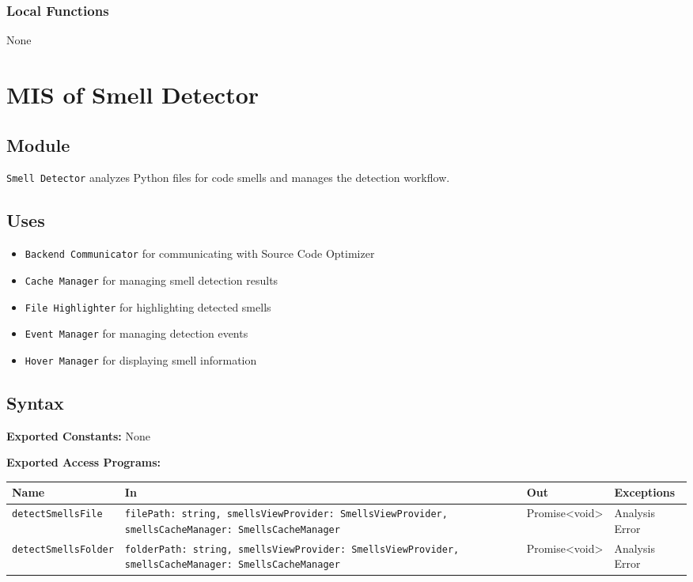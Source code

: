 \documentclass[12pt, titlepage]{article}
\begin{document}
\subsubsection{Local Functions}
None

\section{MIS of Smell Detector}

\subsection{Module}
\texttt{Smell Detector} analyzes Python files for code smells and manages the detection workflow.

\subsection{Uses}
\begin{itemize}
\item \texttt{Backend Communicator} for communicating with Source Code Optimizer
\item \texttt{Cache Manager} for managing smell detection results
\item \texttt{File Highlighter} for highlighting detected smells
\item \texttt{Event Manager} for managing detection events
\item \texttt{Hover Manager} for displaying smell information
\end{itemize}

\subsection{Syntax}

\textbf{Exported Constants:} None

\textbf{Exported Access Programs:}\\
\begin{tabularx}{\linewidth}{|l|>{\raggedright\arraybackslash}X|l|l|}
  \hline
  \textbf{Name} & \textbf{In} & \textbf{Out} & \textbf{Exceptions} \\
  \hline
  \texttt{detectSmellsFile} & \texttt{filePath: string, smellsViewProvider: SmellsViewProvider, smellsCacheManager: SmellsCacheManager} & Promise<void> & Analysis Error \\
  \hline
  \texttt{detectSmellsFolder} & \texttt{folderPath: string, smellsViewProvider: SmellsViewProvider, smellsCacheManager: SmellsCacheManager} & Promise<void> & Analysis Error \\
  \hline
\end{tabularx}
\end{document}
